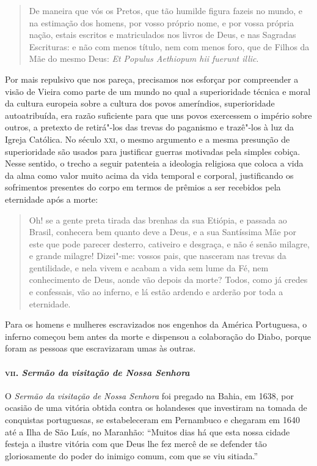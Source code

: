 \begin{quote}
De maneira que vós os Pretos, que tão humilde figura fazeis no mundo,
e na estimação dos homens, por vosso próprio nome, e por vossa própria
nação, estais escritos e matriculados nos livros de Deus, e nas Sagradas
Escrituras: e não com menos título, nem com menos foro, que de Filhos da
Mãe do mesmo Deus: \emph{Et Populus Aethiopum hii fuerunt illic}.
\end{quote}

Por mais repulsivo que nos pareça, precisamos nos esforçar por
compreender a visão de Vieira como parte de um mundo no qual a
superioridade técnica e moral da cultura europeia sobre a cultura dos
povos ameríndios, superioridade autoatribuída, era razão suficiente para
que uns povos exercessem o império sobre outros, a pretexto de
retirá"-los das trevas do paganismo e trazê"-los à luz da Igreja Católica.
No século \textsc{xxi}, o mesmo argumento e a mesma presunção de superioridade
são usados para justificar guerras motivadas pela simples cobiça. Nesse
sentido, o trecho a seguir patenteia a ideologia religiosa que coloca a
vida da alma como valor muito acima da vida temporal e corporal,
justificando os sofrimentos presentes do corpo em termos de prêmios a
ser recebidos pela eternidade após a morte:

\begin{quote}
Oh! se a gente preta tirada das brenhas da sua Etiópia, e passada ao
Brasil, conhecera bem quanto deve a Deus, e a sua Santíssima Mãe por
este que pode parecer desterro, cativeiro e desgraça, e não é senão
milagre, e grande milagre! Dizei"-me: vossos pais, que nasceram nas
trevas da gentilidade, e nela vivem e acabam a vida sem lume da Fé, nem
conhecimento de Deus, aonde vão depois da morte? Todos, como já credes e
confessais, vão ao inferno, e lá estão ardendo e arderão por toda a
eternidade.
\end{quote}

Para os homens e mulheres escravizados nos engenhos da América
Portuguesa, o inferno começou bem antes da morte e dispensou a
colaboração do Diabo, porque foram as pessoas que escravizaram umas às
outras.

\paragraph{\textsc{vii}. \emph{Sermão da visitação de Nossa Senhora}}

O \emph{Sermão da visitação de Nossa Senhora} foi pregado na Bahia, em
1638, por ocasião de uma vitória obtida contra os holandeses que
investiram na tomada de conquistas portuguesas, se estabeleceram em
Pernambuco e chegaram em 1640 até a Ilha de São Luís, no Maranhão:
``Muitos dias há que esta nossa cidade festeja a ilustre vitória com que
Deus lhe fez mercê de se defender tão gloriosamente do poder do inimigo
comum, com que se viu sitiada.''

